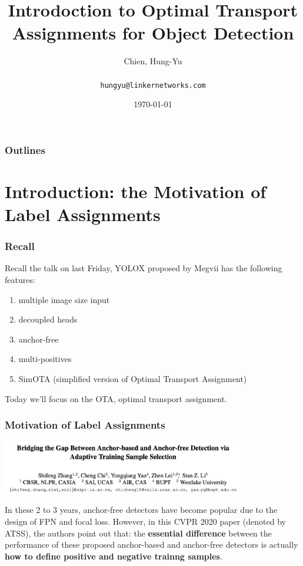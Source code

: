 \documentclass[slidetop, mathserif, dvipsnames]{beamer}
\title[OTA]{Introdoction to Optimal Transport Assignments for Object Detection}
\author[chy1010]{Chien, Hung-Yu \\ \quad \\ {\tt hungyu@linkernetworks.com}}
\date{\today}
\begin{document}
\begin{frame}
	\titlepage
\end{frame}

\section[Outline]{}
\begin{frame}
	\frametitle{Outlines}
	\tableofcontents
\end{frame}

\section{Introduction: the Motivation of Label Assignments}

\begin{frame}
    \frametitle{Recall}
    Recall the talk on last Friday, YOLOX proposed by Megvii has the following features:
    \begin{enumerate}
        \item multiple image size input
        \item decoupled heads
        \item anchor-free
        \item multi-positives
        \item SimOTA (simplified version of Optimal Transport Assignment)
    \end{enumerate}

    \quad

    Today we'll focus on the OTA, optimal transport assignment.

\end{frame}

\begin{frame}
    \frametitle{Motivation of Label Assignments}

    \includegraphics[width=300pt]{pics/atss_paper.png}

    \quad

    In these 2 to 3 years, anchor-free detectors have become popular
    due to the design of FPN and focal loss.
    However, in this CVPR 2020 paper (denoted by ATSS), the authors point out that:
    the {\bf essential difference} between the performance of these proposed
    anchor-based and anchor-free detectors is actually
    {\bf how to define positive and negative trainng samples}.

\end{frame}
\end{document}
